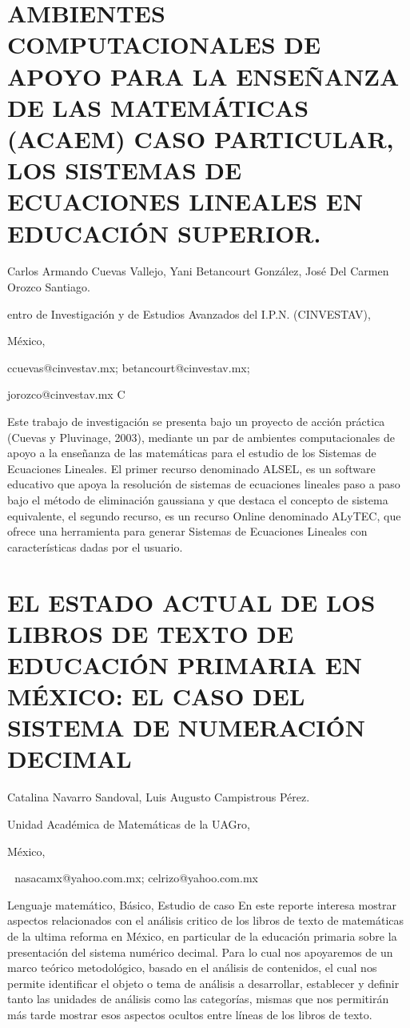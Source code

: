 \section{AMBIENTES COMPUTACIONALES DE APOYO PARA LA ENSEÑANZA DE LAS MATEMÁTICAS
(ACAEM) CASO PARTICULAR, LOS SISTEMAS DE ECUACIONES LINEALES EN EDUCACIÓN
SUPERIOR.}

\begin{datos}

Carlos Armando Cuevas Vallejo, Yani Betancourt González, José Del
Carmen Orozco Santiago.

entro de Investigación y de Estudios Avanzados del I.P.N. (CINVESTAV),

México, 

ccuevas@cinvestav.mx; betancourt@cinvestav.mx;

jorozco@cinvestav.mx C

\end{datos}

Este trabajo de investigación se presenta bajo un proyecto de acción
práctica (Cuevas y Pluvinage, 2003), mediante un par de ambientes
computacionales de apoyo a la enseñanza de las matemáticas para el
estudio de los Sistemas de Ecuaciones Lineales. El primer recurso
denominado ALSEL, es un software educativo que apoya la resolución
de sistemas de ecuaciones lineales paso a paso bajo el método de eliminación
gaussiana y que destaca el concepto de sistema equivalente, el segundo
recurso, es un recurso Online denominado ALyTEC, que ofrece una herramienta
para generar Sistemas de Ecuaciones Lineales con características dadas
por el usuario.


\section{EL ESTADO ACTUAL DE LOS LIBROS DE TEXTO DE EDUCACIÓN PRIMARIA EN
MÉXICO: EL CASO DEL SISTEMA DE NUMERACIÓN DECIMAL }

\begin{datos}

Catalina Navarro Sandoval, Luis Augusto Campistrous Pérez.

Unidad Académica de Matemáticas de la UAGro,

México,

  nasacamx@yahoo.com.mx; celrizo@yahoo.com.mx 

\end{datos}

Lenguaje matemático, Básico, Estudio de caso En este reporte interesa
mostrar aspectos relacionados con el análisis critico de los libros
de texto de matemáticas de la ultima reforma en México, en particular
de la educación primaria sobre la presentación del sistema numérico
decimal. Para lo cual nos apoyaremos de un marco teórico metodológico,
basado en el análisis de contenidos, el cual nos permite identificar
el objeto o tema de análisis a desarrollar, establecer y definir tanto
las unidades de análisis como las categorías, mismas que nos permitirán
más tarde mostrar esos aspectos ocultos entre líneas de los libros
de texto. 


